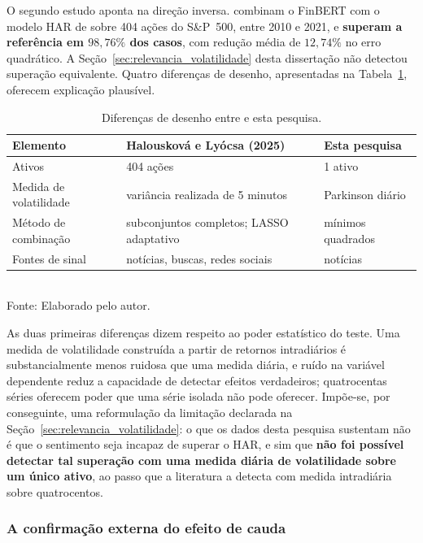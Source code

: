 O segundo estudo aponta na direção inversa.  combinam o
FinBERT com o modelo HAR de  sobre 404 ações do S\&P~500, entre 2010 e
2021, e \textbf{superam a referência em $98{,}76\%$ dos casos}, com redução média de $12{,}74\%$ no
erro quadrático. A Seção~\ref{sec:relevancia_volatilidade} desta dissertação não detectou superação
equivalente. Quatro diferenças de desenho, apresentadas na Tabela~\ref{tab:contraste_desenho},
oferecem explicação plausível.

\begin{table}[htpb]
\centering
\caption{Diferenças de desenho entre  e esta pesquisa.}
\label{tab:contraste_desenho}
\begin{tabular}{l l l}
\hline
\textbf{Elemento} & \textbf{Halousková e Lyócsa (2025)} & \textbf{Esta pesquisa} \\ \hline
Ativos & 404 ações & 1 ativo \\
Medida de volatilidade & variância realizada de 5 minutos & Parkinson diário \\
Método de combinação & subconjuntos completos; LASSO adaptativo & mínimos quadrados \\
Fontes de sinal & notícias, buscas, redes sociais & notícias \\
\hline
\end{tabular}
\vspace{0.2cm}
{\small \\ Fonte: Elaborado pelo autor.}
\end{table}

As duas primeiras diferenças dizem respeito ao poder estatístico do teste. Uma medida de
volatilidade construída a partir de retornos intradiários é substancialmente menos ruidosa que uma
medida diária, e ruído na variável dependente reduz a capacidade de detectar efeitos verdadeiros;
quatrocentas séries oferecem poder que uma série isolada não pode oferecer. Impõe-se, por
conseguinte, uma reformulação da limitação declarada na
Seção~\ref{sec:relevancia_volatilidade}: o que os dados desta pesquisa sustentam não é que o
sentimento seja incapaz de superar o HAR, e sim que \textbf{não foi possível detectar tal superação
com uma medida diária de volatilidade sobre um único ativo}, ao passo que a literatura a detecta com
medida intradiária sobre quatrocentos.

\subsubsection{A confirmação externa do efeito de cauda}

